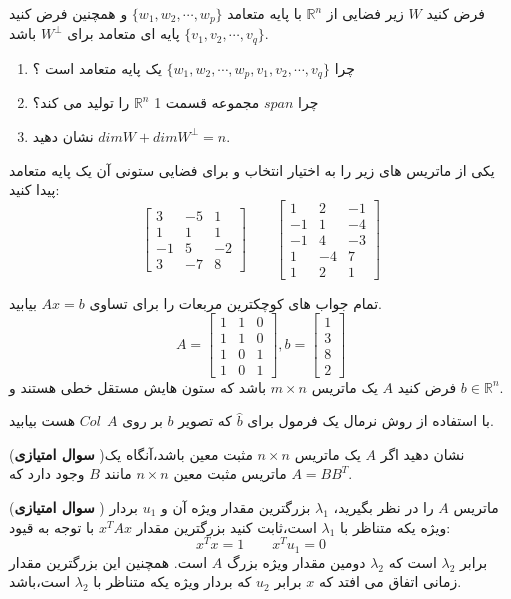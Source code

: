 \documentclass{article}
\begin{document}
	 فرض کنید 
	$W$
	زیر فضایی از 
	$\mathbb{R}^n$
	با پایه متعامد 
	$\{w_1,w_2,\cdots,w_p\}$
	و همچنین فرض کنید 
	$\{v_1,v_2,\cdots,v_q\}$
	پایه ای متعامد برای 
	$W^{\perp}$
	باشد.
	\begin{enumerate}
		\item 
		چرا 
		$\{w_1,w_2,\cdots,w_p,v_1,v_2,\cdots,v_q\}$
		یک پایه متعامد است ؟
		\item 
		چرا 
		$span$
		مجموعه قسمت 1
		$\mathbb{R}^n$
		را تولید می کند؟
		\item 
		نشان دهید
		$dim W+dim W^{\perp}=n$.
		
		
	\end{enumerate}
	یکی از ماتریس های زیر را به اختیار انتخاب و برای فضایی ستونی آن یک پایه متعامد پیدا کنید:
	$$\begin{bmatrix}
	3&-5&1\\
	1&1&1\\
	-1&5&-2\\
	3&-7&8
	\end{bmatrix} \qquad
	\begin{bmatrix}
	1&2&-1\\
	-1&1&-4\\
	-1&4&-3\\
	1&-4&7\\
	1&2&1
	\end{bmatrix}
	$$
	
	
	 تمام جواب های کوچکترین مربعات را برای تساوی 
	$Ax=b$
	بیابید.
	$$A= \begin{bmatrix}
	1&1&0\\
	1&1&0\\
	1&0&1\\
	1&0&1
	\end{bmatrix},
	b=\begin{bmatrix}
	1\\
	3\\
	8\\
	2
	\end{bmatrix}
	$$
	فرض کنید 
	$A$
	یک ماتریس 
	$m\times n$
	باشد که ستون هایش مستقل خطی هستند و
	$b\in \mathbb{R}^n$.
	
	با استفاده  از
	روش نرمال یک فرمول برای 
	$\hat{b}$
	که تصویر 
	$b$
	بر روی 
	$Col \ \ A$
	هست بیابید.
	
	({\bf سوال امتیازی })نشان دهید اگر 
	$A$
	یک ماتریس
	$n\times n$
	مثبت معین باشد،آنگاه یک ماتریس مثبت معین 
	$n\times n$
	مانند 
	$B$
	وجود دارد که 
	$A=BB^T$.
	
	
	({\bf سوال امتیازی }) ماتریس 
	$A$
	را در نظر بگیرید،
	$\lambda_1$
	بزرگترین مقدار ویژه آن و
	$u_1$
	بردار ویژه یکه متناظر با 
	$\lambda_1$
	است،ثابت کنید بزرگترین مقدار 
	$x^TAx$
	با توجه به قیود:
	$$x^Tx=1\qquad x^Tu_1=0$$
	برابر 
	$\lambda_2$
	است که 
	$\lambda_2$
	دومین مقدار ویژه بزرگ 
	$A$
	است. همچنین این بزرگترین مقدار زمانی اتفاق می افتد که 
	$x$
	برابر 
	$u_2$
	که بردار ویژه یکه متناظر با 
	$\lambda_2$
	است،باشد.
	
\end{document}
